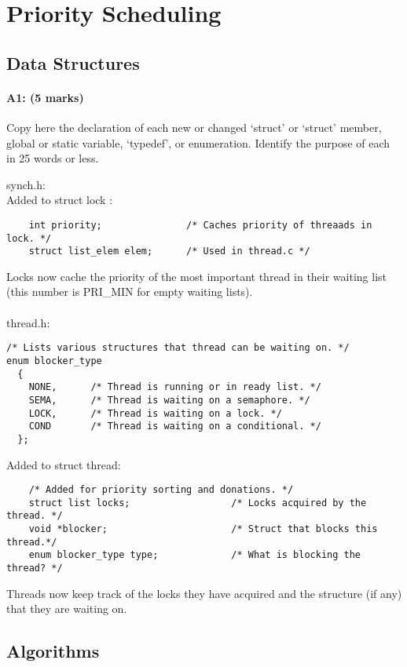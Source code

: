 \section{Priority Scheduling}
\subsection{Data Structures}
\paragraph{A1: (5 marks)}
Copy here the declaration of each new or changed `struct' or `struct' member, global or static variable, `typedef', or enumeration.  Identify the purpose of each in 25 words or less.

synch.h:\\
Added to struct lock :
\begin{verbatim}
    int priority;               /* Caches priority of threaads in lock. */
    struct list_elem elem;      /* Used in thread.c */
\end{verbatim}
Locks now cache the priority of the most important thread in their waiting list (this number is PRI\_MIN for empty waiting lists).\\ \\

thread.h:
\begin{verbatim}
/* Lists various structures that thread can be waiting on. */
enum blocker_type
  {
    NONE,      /* Thread is running or in ready list. */
    SEMA,      /* Thread is waiting on a semaphore. */
    LOCK,      /* Thread is waiting on a lock. */
    COND       /* Thread is waiting on a conditional. */
  };
\end{verbatim}

Added to struct thread:
\begin{verbatim}
    /* Added for priority sorting and donations. */
    struct list locks;                  /* Locks acquired by the thread. */
    void *blocker;                      /* Struct that blocks this thread.*/
    enum blocker_type type;             /* What is blocking the thread? */
\end{verbatim}
Threads now keep track of the locks they have acquired and the structure (if any) that they are waiting on.


\subsection{Algorithms}
